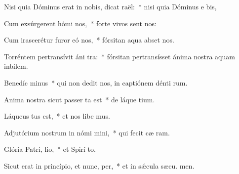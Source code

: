 \item Nisi quia Dóminus erat in nobis, dicat  raël:~* nisi quia Dóminus e  bis,
\item Cum exsúrgerent hómi  nos,~* forte vivos sent nos:
\item Cum irascerétur furor eó  nos,~* fórsitan aqua abset nos.
\item Torréntem pertransívit áni tra:~* fórsitan pertransísset ánima nostra aquam inbilem.
\item Benedíc minus~* qui non dedit nos, in captiónem dénti rum.
\item Anima nostra sicut passer ta est~* de láque tium.
\item Láqueus tus est,~* et nos libe mus.
\item Adjutórium nostrum in nómi mini,~* qui fecit cæ  ram.
\item Glória Patri,  lio,~* et Spirí to.
\item Sicut erat in princípio, et nunc,  per,~* et in sǽcula sæcu. men.
